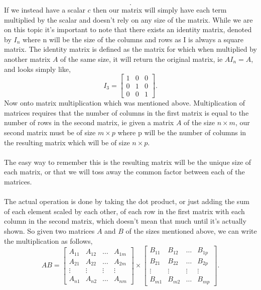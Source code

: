 \documentclass{report}
\begin{document}
\begin{multicols}{2}
\[.\] 
If we instead have a scalar $ c $ then our matrix will simply have each term multiplied by the scalar and doesn't rely on any size of the matrix. While we are on this topic it's important to note that there exists an identity matrix, denoted by $ I_{ n } $ where n will be the size of the columns and rows as I is always a square matrix. The identity matrix is defined as the matrix for which when multiplied by another matrix $ A $ of the same size, it will return the original matrix, ie $ AI_{ n } = A $, and looks simply like,
\[
I_{ 3 } = \begin{bmatrix} 1 & 0 & 0 \\ 0 & 1 & 0 \\ 0 & 0 & 1 \end{bmatrix}
.\] 
Now onto matrix multiplication which was mentioned above. Multiplication of matrices requires that the number of columns in the first matrix is equal to the number of rows in the second matrix, ie given a matrix $ A $ of the size $ n \times m $, our second matrix must be of size $ m \times p $ where p will be the number of columns in the resulting matrix which will be of size $ n \times p $. \\ \\ The easy way to remember this is the resulting matrix will be the unique size of each matrix, or that we will toss away the common factor between each of the matrices. \\ \\
The actual operation is done by taking the dot product, or just adding the sum of each element scaled by each other, of each row in the first matrix with each column in the second matrix, which doesn't mean that much until it's actually shown. So given two matrices $ A $ and $ B $ of the sizes mentioned above, we can write the multiplication as follows,
\[
AB = \begin{bmatrix} A_{ 11 } & A_{ 12 } & \ldots &  A_{ 1m } \\ A_{ 21 } & A_{ 22 } & \ldots & A_{ 2m } \\ \vdots & \vdots & \vdots & \vdots \\ A_{ n1 } & A_{ n2 } & \ldots & A_{ nm }\end{bmatrix} \times \begin{bmatrix} B_{ 11 } & B_{ 12 } & \ldots &  B_{ 1p } \\ B_{ 21 } & B_{ 22 } & \ldots & B_{ 2p } \\ \vdots & \vdots & \vdots & \vdots \\ B_{ m1 } & B_{ m2 } & \ldots & B_{ mp }\end{bmatrix}
.\] 
\end{multicols}
\end{document}
